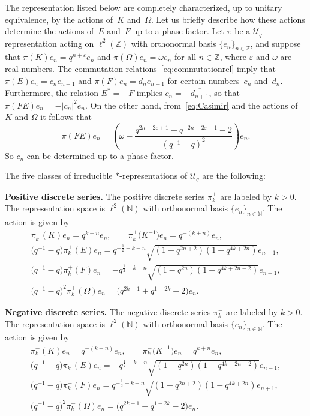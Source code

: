 \documentclass[11pt]{article}
\numberwithin{equation}{section}
\numberwithin{theorem}{section}
\numberwithin{proposition}{section}
\numberwithin{lemma}{section}
\numberwithin{corollary}{section}
\numberwithin{definition}{section}
\numberwithin{example}{section}
\numberwithin{remark}{section}
\numberwithin{note}{section}
\newcommand{\N}{\mathbb N}
\newcommand{\Z}{\mathbb Z}
\newcommand{\eps}{\varepsilon}
\newcommand{\U}{\mathcal U}
\begin{document}
The representation listed below are completely characterized, up to unitary equivalence, by the actions of~$K$ and~$\Omega$. Let us brief\/ly describe how these actions determine the actions of~$E$ and~$F$ up to a phase factor. Let $\pi$ be a $\U_q$-representation acting on $\ell^2(\Z)$ with orthonormal basis $\{e_n\}_{n \in \Z}$, and suppose that $\pi(K)e_n=q^{n+\eps}e_n$ and $\pi(\Omega)e_n = \omega e_n$ for all $n \in \Z$, where $\eps$ and $\omega$ are real numbers. The commutation relations~\eqref{eq:commutationrel} imply that $\pi(E)e_n = c_n e_{n+1}$ and $\pi(F) e_n = d_n e_{n-1}$ for certain numbers~$c_n$ and~$d_n$. Furthermore, the relation $E^*=-F$ implies $c_n=-\overline{d_{n+1}}$, so that $\pi(FE) e_n = - |c_n|^2 e_n$. On the other hand, from~\eqref{eq:Casimir} and the actions of $K$ and $\Omega$ it follows that
\[
\pi(FE) e_n = \left(\omega-\frac{q^{2n+2\eps+1}+q^{-2n-2\eps-1}-2}{(q^{-1}-q)^2}\right)e_n.
\]
So $c_n$ can be determined up to a phase factor.

The f\/ive classes of irreducible $*$-representations of $\U_q$ are the following:

\textbf{Positive discrete series.} The positive discrete series $\pi^+_k$
are labeled by $k>0$. The representation space is $\ell^2(\N)$
with orthonormal basis $\{e_n\}_{n \in \N }$. The action is
given by
\begin{gather}
\pi^+_k(K)  e_n  = q^{k+n}  e_n, \qquad \pi^+_k\big(K^{-1}\big)  e_n =q^{-(k+n)} e_n, \nonumber \\
\big(q^{-1}-q\big)\pi^+_k(E)  e_n  = q^{-\frac12-k-n} \sqrt{(1-q^{2n+2})(1-q^{4k+2n})}  e_{n+1},  \nonumber\\
\big(q^{-1}-q\big)\pi^+_k(F)  e_n  = -q^{\frac12-k-n}
\sqrt{(1-q^{2n})(1-q^{4k+2n-2})}  e_{n-1},\nonumber\\
\big(q^{-1}-q\big)^2 \pi^+_k(\Omega)  e_n  = \big(q^{2k-1}+q^{1-2k}-2\big)  e_n.\label{eq:pos}
\end{gather}

\textbf{Negative discrete series.} The negative discrete series
$\pi^-_k$ are labeled by $k>0$. The representation space is
$\ell^2(\N)$ with orthonormal basis $\{e_n\}_{n \in \N}$. The action is given by
\begin{gather}
\pi^-_k(K) e_n = q^{-(k+n)} e_n, \qquad \pi^-_k\big(K^{-1}\big) e_n =q^{k+n} e_n,
 \nonumber\\
 \big(q^{-1}-q\big)\pi^-_k(E)  e_n  = -q^{\frac12-k-n}
\sqrt{(1-q^{2n})(1-q^{4k+2n-2})}  e_{n-1},
\nonumber\\
\big(q^{-1}-q\big)\pi^-_k(F) e_n = q^{-\frac12-k-n}
\sqrt{(1-q^{2n+2})(1-q^{4k+2n})} e_{n+1}, \nonumber\\
\big(q^{-1}-q\big)^2 \pi^-_k(\Omega) e_n = \big(q^{2k-1}+q^{1-2k}-2\big) e_n.\label{eq:neg}
\end{gather}
\end{document}
